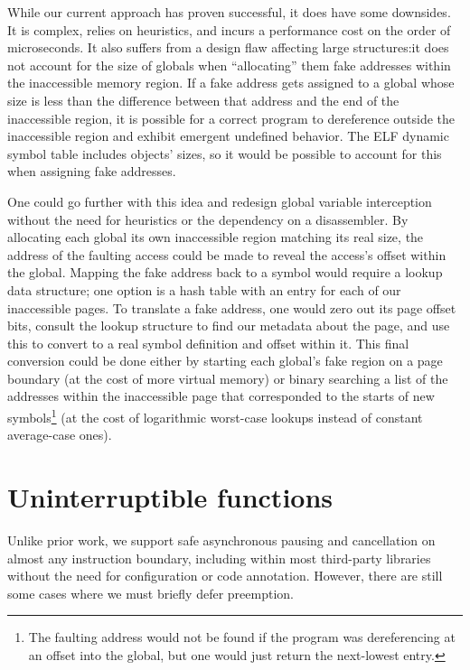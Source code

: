 While our current approach has proven successful, it does have some downsides.  It is
complex, relies on heuristics, and incurs a performance cost on the order of
microseconds.  It also suffers from a design flaw affecting large structures:\@ it
does not account for the size of globals when ``allocating'' them fake addresses
within the inaccessible memory region.  If a fake address gets assigned to a global
whose size is less than the difference between that address and the end of the
inaccessible region, it is possible for a correct program to dereference outside the
inaccessible region and exhibit emergent undefined behavior.  The ELF dynamic symbol
table includes objects' sizes, so it would be possible to account for this when
assigning fake addresses.

One could go further with this idea and redesign global variable interception without
the need for heuristics or the dependency on a disassembler.  By allocating each
global its own inaccessible region matching its real size, the address of the
faulting access could be made to reveal the access's offset within the global.
Mapping the fake address back to a symbol would require a lookup data structure; one
option is a hash table with an entry for each of our inaccessible pages.  To
translate a fake address, one would zero out its page offset bits, consult the lookup
structure to find our metadata about the page, and use this to convert to a real
symbol definition and offset within it.  This final conversion could be done either
by starting each global's fake region on a page boundary (at the cost of more virtual
memory) or binary searching a list of the addresses within the inaccessible page that
corresponded to the starts of new symbols\footnote{The faulting address would not be
found if the program was dereferencing at an offset into the global, but one would
just return the next-lowest entry.} (at the cost of logarithmic worst-case lookups
instead of constant average-case ones).


\section{Uninterruptible functions}
\label{sec:libgotcha:unint}

Unlike prior work, we support safe asynchronous pausing and cancellation on almost
any instruction boundary, including within most third-party libraries without
the need for configuration or code annotation.  However, there are still some cases
where we must briefly defer preemption.

